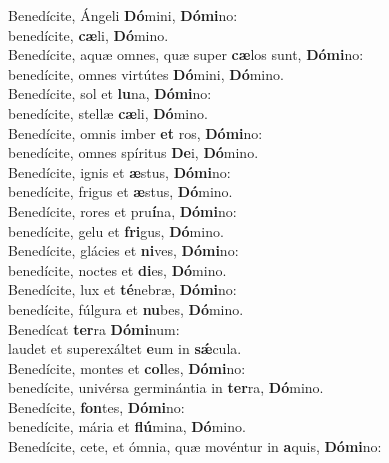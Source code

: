 \evenverse Benedícite, Ángeli \textbf{Dó}mini, \textbf{Dó}\textbf{mi}no:~\*\\
\evenverse benedícite, \textbf{cæ}li, \textbf{Dó}mino.\\
\oddverse Benedícite, aquæ omnes, quæ super \textbf{cæ}los sunt, \textbf{Dó}\textbf{mi}no:~\*\\
\oddverse benedícite, omnes virtútes \textbf{Dó}mini, \textbf{Dó}mino.\\
\evenverse Benedícite, sol et \textbf{lu}na, \textbf{Dó}\textbf{mi}no:~\*\\
\evenverse benedícite, stellæ \textbf{cæ}li, \textbf{Dó}mino.\\
\oddverse Benedícite, omnis imber \textbf{et} ros, \textbf{Dó}\textbf{mi}no:~\*\\
\oddverse benedícite, omnes spíritus \textbf{De}i, \textbf{Dó}mino.\\
\evenverse Benedícite, ignis et \textbf{æ}stus, \textbf{Dó}\textbf{mi}no:~\*\\
\evenverse benedícite, frigus et \textbf{æ}stus, \textbf{Dó}mino.\\
\oddverse Benedícite, rores et pru\textbf{í}na, \textbf{Dó}\textbf{mi}no:~\*\\
\oddverse benedícite, gelu et \textbf{fri}gus, \textbf{Dó}mino.\\
\evenverse Benedícite, glácies et \textbf{ni}ves, \textbf{Dó}\textbf{mi}no:~\*\\
\evenverse benedícite, noctes et \textbf{di}es, \textbf{Dó}mino.\\
\oddverse Benedícite, lux et \textbf{té}nebræ, \textbf{Dó}\textbf{mi}no:~\*\\
\oddverse benedícite, fúlgura et \textbf{nu}bes, \textbf{Dó}mino.\\
\evenverse Benedícat \textbf{ter}ra \textbf{Dó}\textbf{mi}num:~\*\\
\evenverse laudet et superexáltet \textbf{e}um in \textbf{sǽ}cula.\\
\oddverse Benedícite, montes et \textbf{col}les, \textbf{Dó}\textbf{mi}no:~\*\\
\oddverse benedícite, univérsa germinántia in \textbf{ter}ra, \textbf{Dó}mino.\\
\evenverse Benedícite, \textbf{fon}tes, \textbf{Dó}\textbf{mi}no:~\*\\
\evenverse benedícite, mária et \textbf{flú}mina, \textbf{Dó}mino.\\
\oddverse Benedícite, cete, et ómnia, quæ movéntur in \textbf{a}quis, \textbf{Dó}\textbf{mi}no:~\*\\
